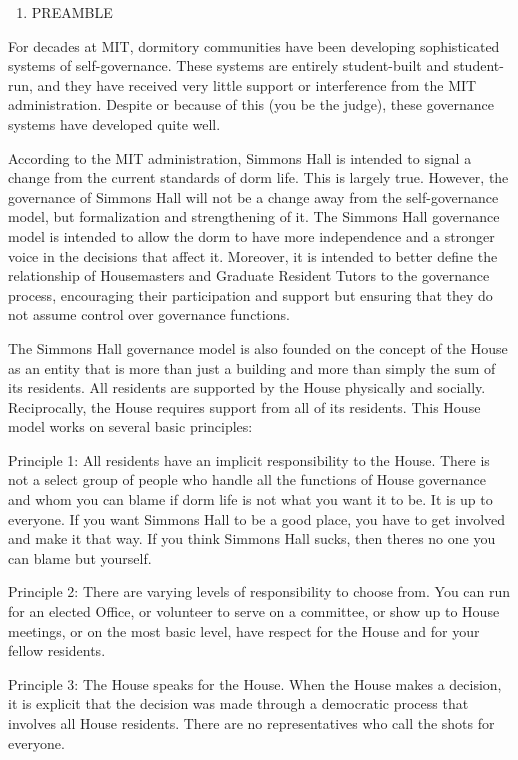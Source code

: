 \documentclass[letterpaper]{article}
\title{}
\author{C.Heber}
\date{2012-11-21}
\newcommand\liststyleWWNumv{%
\renewcommand\theenumi{\Roman{enumi}}
\renewcommand\theenumii{\arabic{enumii}}
\renewcommand\theenumiii{\arabic{enumiii}}
\renewcommand\theenumiv{\arabic{enumiv}}
\renewcommand\labelenumi{\theenumi.}
\renewcommand\labelenumii{\theenumii.}
\renewcommand\labelenumiii{\theenumiii)}
\renewcommand\labelenumiv{\theenumiv.}
}
\begin{document}
\liststyleWWNumv
\begin{enumerate}
\item \clearpage\setcounter{page}{1}\pagestyle{Standard}

PREAMBLE 
\end{enumerate}
For decades at MIT, dormitory communities have been developing
sophisticated systems of self-governance. These systems are entirely
student-built and student-run, and they have received very little
support or interference from the MIT administration. Despite or because
of this (you be the judge), these governance systems have developed
quite well.

According to the MIT administration, Simmons Hall is intended to signal
a change from the current standards of dorm life. This is largely true.
However, the governance of Simmons Hall will not be a change away from
the self-governance model, but formalization and strengthening of it.
The Simmons Hall governance model is intended to allow the dorm to have
more independence and a stronger voice in the decisions that affect it.
Moreover, it is intended to better define the relationship of
Housemasters and Graduate Resident Tutors to the governance process,
encouraging their participation and support but ensuring that they do
not assume control over governance functions.

The Simmons Hall governance model is also founded on the concept of the
House as an entity that is more than just a building and more than
simply the sum of its residents. All residents are supported by the
House physically and socially. Reciprocally, the House requires support
from all of its residents. This House model works on several basic
principles:

Principle 1: All residents have an implicit responsibility to the House.
There is not a select group of people who handle all the functions of
House governance and whom you can blame if dorm life is not what you
want it to be. It is up to everyone. If you want Simmons Hall to be a
good place, you have to get involved and make it that way. If you think
Simmons Hall sucks, then there{\textquotesingle}s no one you can blame
but yourself.

Principle 2: There are varying levels of responsibility to choose from.
You can run for an elected Office, or volunteer to serve on a
committee, or show up to House meetings, or on the most basic level,
have respect for the House and for your fellow residents. 

Principle 3: The House speaks for the House. When the House makes a
decision, it is explicit that the decision was made through a
democratic process that involves all House residents. There are no
representatives who {\textquotedbl}call the shots{\textquotedbl} for
everyone.
\end{document}
